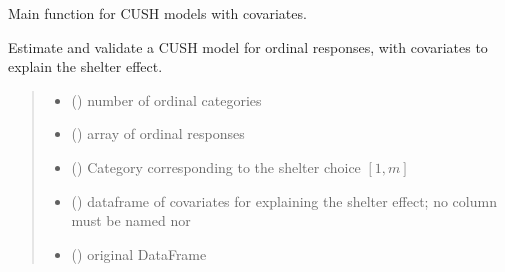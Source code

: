 \documentclass[letterpaper,10pt,english]{sphinxmanual}
\begin{document}

\begin{fulllineitems}
\label{\detokenize{cubmods:cubmods.cush_x.mle}}
\pysigstartsignatures
{}
\pysigstopsignatures
\sphinxAtStartPar
Main function for CUSH models with covariates.

\sphinxAtStartPar
Estimate and validate a CUSH model for ordinal responses, with covariates
to explain the shelter effect.
\begin{quote}\begin{description}
\begin{itemize}
\item {} 
\sphinxAtStartPar
{} () \textendash{} number of ordinal categories

\item {} 
\sphinxAtStartPar
{} () \textendash{} array of ordinal responses

\item {} 
\sphinxAtStartPar
{} () \textendash{} Category corresponding to the shelter choice \([1,m]\)

\item {} 
\sphinxAtStartPar
{} () \textendash{} dataframe of covariates for explaining the shelter effect;
no column must be named  nor 

\item {} 
\sphinxAtStartPar
{} () \textendash{} original DataFrame


\end{itemize}
\end{description}
\end{quote}
\end{fulllineitems}
\end{document}
